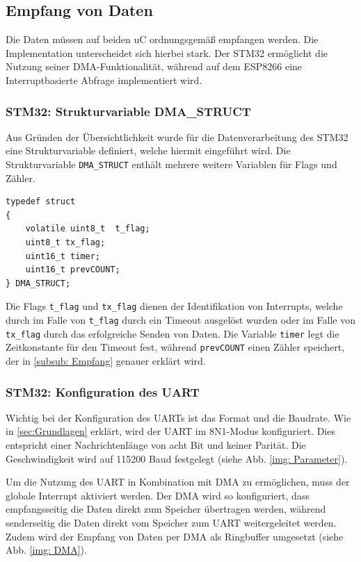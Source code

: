 \subsection{Empfang von Daten}

Die Daten müssen auf beiden \ac{uC} ordnungsgemäß empfangen werden. Die Implementation unterscheidet sich hierbei stark. Der STM32 ermöglicht
die Nutzung seiner \ac{DMA}-Funktionalität, während auf dem ESP8266 eine Interruptbasierte Abfrage implementiert wird.

\subsubsection{STM32: Strukturvariable DMA\_STRUCT}

Aus Gründen der Übersichtlichkeit wurde für die Datenverarbeitung des STM32 eine Strukturvariable definiert, welche hiermit eingeführt wird.
Die Strukturvariable \lstinline!DMA_STRUCT! enthält mehrere weitere Variablen für Flags und Zähler.

\begin{lstlisting}
typedef struct
{
    volatile uint8_t  t_flag;   
    uint8_t tx_flag;			
    uint16_t timer;             
    uint16_t prevCOUNT;         
} DMA_STRUCT;
\end{lstlisting}

Die Flags \lstinline!t_flag! und \lstinline!tx_flag! dienen der Identifikation von Interrupts, welche durch im Falle von \lstinline!t_flag! durch ein
Timeout ausgelöst wurden oder im Falle von \lstinline!tx_flag! durch das erfolgreiche Senden von Daten. Die Variable \lstinline!timer! legt 
die Zeitkonstante für den Timeout fest, während \lstinline!prevCOUNT! einen Zähler speichert, der in \ref{subsub: Empfang} genauer erklärt wird.   

\subsubsection{STM32: Konfiguration des UART}
Wichtig bei der Konfiguration des \acp{UART} ist das Format und die Baudrate. Wie in \ref{sec:Grundlagen} erklärt, wird der \ac{UART} im 8N1-Modus
konfiguriert. Dies entspricht einer Nachrichtenlänge von acht Bit und keiner Parität. Die Geschwindigkeit wird auf 115200 Baud festgelegt (siehe Abb. \ref{img: Parameter}). 

\smallskip

Um die Nutzung des \ac{UART} in Kombination mit \ac{DMA} zu ermöglichen, muss der globale Interrupt
aktiviert werden. Der \ac{DMA} wird so konfiguriert, dass empfangsseitig die Daten direkt zum Speicher übertragen werden, während senderseitig die Daten
direkt vom Speicher zum \ac{UART} weitergeleitet werden. Zudem wird der Empfang von Daten per \ac{DMA} als Ringbuffer umgesetzt (siehe Abb. \ref{img: DMA}).


